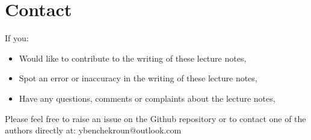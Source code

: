\documentclass[main]{subfiles}
\begin{document}
\section*{Contact}
If you:
\begin{itemize}
    \item Would like to contribute to the writing of these lecture notes,
    \item Spot an error or inaccuracy in the writing of these lecture notes,
    \item Have any questions, comments or complaints about the lecture notes, \citep{liu2002analog}
\end{itemize}
Please feel free to raise an issue on the Github repository or to contact one of the authors directly at: ybenchekroun@outlook.com
\end{document}
